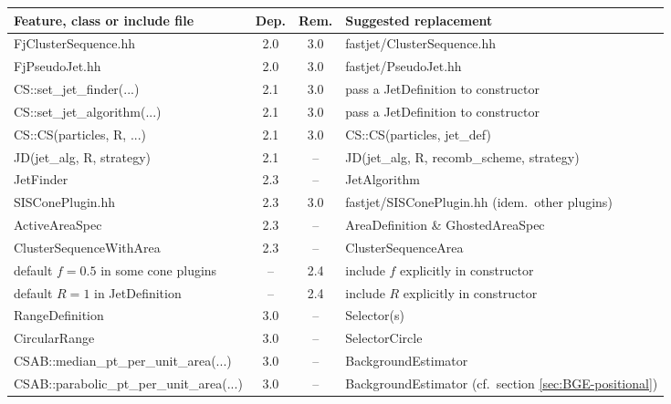 \documentclass[12pt,a4]{article}
\begin{document}
\begin{table}
  \centering
  \begin{tabular}{lccl}\toprule
    Feature, class or include file
                    & Dep. & Rem.  & Suggested replacement\\\midrule
    FjClusterSequence.hh 
                    & 2.0   & 3.0  & fastjet/ClusterSequence.hh\\
    FjPseudoJet.hh  & 2.0   & 3.0  & fastjet/PseudoJet.hh\\\midrule
    CS::set\_jet\_finder(...)    & 2.1 & 3.0 & pass a JetDefinition to constructor\\
    CS::set\_jet\_algorithm(...) & 2.1 & 3.0 & pass a JetDefinition to constructor\\
    CS::CS(particles, R, ...)    & 2.1 & 3.0 & CS::CS(particles, jet\_def)\\
    JD(jet\_alg, R, strategy)    & 2.1 & --  & JD(jet\_alg, R, recomb\_scheme, strategy)\\
    \midrule
    JetFinder       & 2.3    & --  & JetAlgorithm \\
    SISConePlugin.hh  
                    & 2.3    & 3.0  & fastjet/SISConePlugin.hh (idem.\ other plugins)\\
    ActiveAreaSpec  & 2.3   &  --  & AreaDefinition \& GhostedAreaSpec\\
    ClusterSequenceWithArea 
                    & 2.3   &  --  & ClusterSequenceArea\\\midrule
    default $f=0.5$ in some cone plugins
                    & --    &  2.4 & include $f$ explicitly in constructor\\
    default $R=1$ in JetDefinition
                    & --    &  2.4 & include $R$ explicitly in constructor\\
    \midrule %
    RangeDefinition & 3.0   &  --  & Selector(s)        \\
    CircularRange   & 3.0   &  --  & SelectorCircle     \\
    CSAB::median\_pt\_per\_unit\_area(...)
                   & 3.0    & --   & BackgroundEstimator\\
    CSAB::parabolic\_pt\_per\_unit\_area(...)
                   & 3.0    & --   & BackgroundEstimator (cf.\ section \ref{sec:BGE-positional})\\

\end{tabular}
\end{table}
\end{document}
